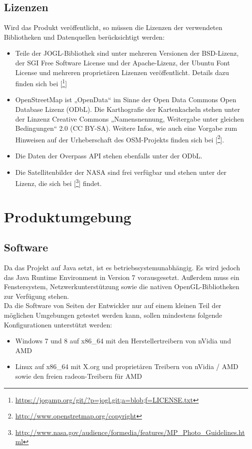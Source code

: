 \documentclass[10pt]{scrreprt}
\begin{document}
\section{Lizenzen}
Wird das Produkt veröffentlicht, so müssen die Lizenzen der verwendeten Bibliotheken und Datenquellen berücksichtigt werden:
\begin{itemize}
\item Teile der JOGL-Bibliothek sind unter mehreren Versionen der BSD-Lizenz, der SGI Free Software License und der Apache-Lizenz, der Ubuntu Font License und mehreren proprietären Lizenzen veröffentlicht. Details dazu finden sich bei [\footnote{\url{https://jogamp.org/git/?p=jogl.git;a=blob;f=LICENSE.txt}}]
\item OpenStreetMap ist „OpenData“ im Sinne der Open Data Commons Open Database Lizenz (ODbL). Die Karthografie der Kartenkacheln stehen unter der Linzenz  Creative Commons „Namensnennung, Weitergabe unter gleichen Bedingungen“ 2.0 (CC BY-SA). Weitere Infos, wie auch eine Vorgabe zum Hinweisen auf der Urheberschaft des OSM-Projekts finden sich bei [\footnote{\url{http://www.openstretmap.org/copyright}}].
\item Die Daten der Overpass API stehen ebenfalls unter der ODbL.
\item Die Satellitenbilder der NASA sind frei verfügbar und stehen unter der Lizenz, die sich bei [\footnote{\url{http://www.nasa.gov/audience/formedia/features/MP_Photo_Guidelines.html}}] findet.
\end{itemize}




\chapter{Produktumgebung}
\section{Software}
Da das Projekt auf Java setzt, ist es betriebssystemunabhängig. Es wird jedoch das Java Runtime Environment in Version 7 vorausgesetzt. Außerdem muss ein Fenstersystem, Netzwerkunterstützung sowie die nativen OpenGL-Bibliotheken zur Verfügung stehen. \\

Da die Software von Seiten der Entwickler nur auf einem kleinen Teil der möglichen Umgebungen getestet werden kann, sollen mindestens folgende Konfigurationen unterstützt werden:
\begin{itemize}
\item Windows 7 und 8 auf x86{\_}64 mit den Herstellertreibern von nVidia und AMD
\item Linux auf x86{\_}64 mit X.org und proprietären Treibern von nVidia / AMD sowie den freien radeon-Treibern für AMD
\end{itemize}
\end{document}
